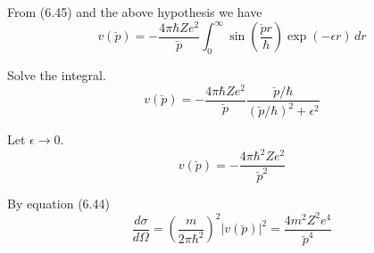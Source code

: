 \documentclass[12pt]{article}
\begin{document}
From (6.45) and the above hypothesis we have
\begin{equation*}
v(\breve p)=-\frac{4\pi\hbar Ze^2}{\breve p}
\int_0^\infty\sin\left(\frac{\breve pr}{\hbar}\right)\exp(-\epsilon r)\,dr
\end{equation*}

Solve the integral.
\begin{equation*}
v(\breve p)=-\frac{4\pi\hbar Ze^2}{\breve p}\frac{\breve p/\hbar}{(\breve p/\hbar)^2+\epsilon^2}
\end{equation*}

Let $\epsilon\rightarrow0$.
\begin{equation*}
v(\breve p)=-\frac{4\pi\hbar^2Ze^2}{\breve p^2}
\end{equation*}

By equation (6.44)
\begin{equation*}
\frac{d\sigma}{d\Omega}=\left(\frac{m}{2\pi\hbar^2}\right)^2
|v(\breve p)|^2
=\frac{4m^2Z^2e^4}{\breve p^4}
\end{equation*}
\end{document}

